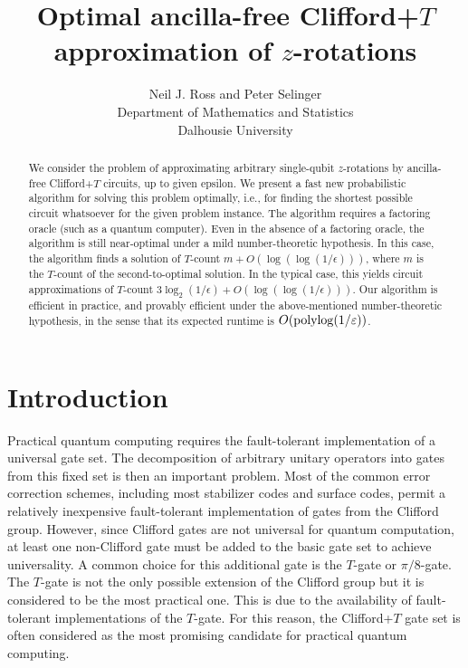\documentclass{article}
\title{Optimal ancilla-free Clifford+$T$ approximation of $z$-rotations}
\author{\begin{tabular}{c}
    Neil J. Ross and Peter Selinger \\[.5ex]
    \normalsize Department of Mathematics and Statistics \\
    \normalsize Dalhousie University
  \end{tabular}
}
\date{}
\begin{document}
\maketitle

\begin{abstract}
  We consider the problem of approximating arbitrary single-qubit
  $z$-rotations by ancilla-free Clifford+$T$ circuits, up to given
  epsilon. We present a fast new probabilistic algorithm for
  solving this problem optimally, i.e., for finding the shortest
  possible circuit whatsoever for the given problem instance. The
  algorithm requires a factoring oracle (such as a quantum
  computer). Even in the absence of a factoring oracle, the algorithm
  is still near-optimal under a mild number-theoretic hypothesis. In
  this case, the algorithm finds a solution of $T$-count
  $m + O(\log(\log(1/\epsilon)))$, where $m$ is the $T$-count of the
  second-to-optimal solution. In the typical case, this yields circuit
  approximations of $T$-count $3\log_2(1/\epsilon) +
  O(\log(\log(1/\epsilon)))$. Our algorithm is efficient in practice,
  and provably efficient under the above-mentioned number-theoretic
  hypothesis, in the sense that its expected runtime is
  $O(\mathop{\rm polylog}\nolimits(1/\varepsilon))$.
\end{abstract}

\section{Introduction}

Practical quantum computing requires the fault-tolerant implementation
of a universal gate set. The decomposition of arbitrary unitary
operators into gates from this fixed set is then an important
problem. Most of the common error correction schemes, including most
stabilizer codes and surface codes, permit a relatively inexpensive
fault-tolerant implementation of gates from the Clifford
group. However, since Clifford gates are not universal for quantum
computation, at least one non-Clifford gate must be added to the basic
gate set to achieve universality. A common choice for this additional
gate is the $T$-gate or $\pi/8$-gate. The $T$-gate is not the only
possible extension of the Clifford group but it is considered to be
the most practical one. This is due to the availability of
fault-tolerant implementations of the $T$-gate. For this reason, the
Clifford+$T$ gate set is often considered as the most promising
candidate for practical quantum computing.
\end{document}
